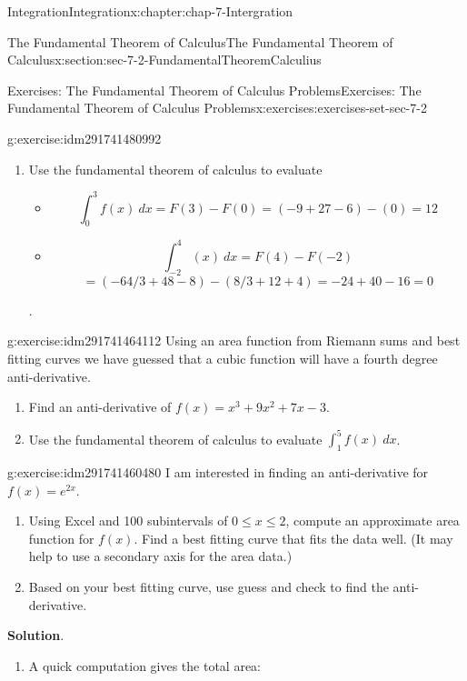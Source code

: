 \documentclass[oneside,10pt,]{book}
\numberwithin{equation}{section}
\begin{document}
\begin{chapterptx}{Integration}{}{Integration}{}{}{x:chapter:chap-7-Intergration}
\begin{sectionptx}{The Fundamental Theorem of Calculus}{}{The Fundamental Theorem of Calculus}{}{}{x:section:sec-7-2-FundamentalTheoremCalculius}
\begin{exercises-subsection}{Exercises: The Fundamental Theorem of Calculus Problems}{}{Exercises: The Fundamental Theorem of Calculus Problems}{}{}{x:exercises:exercises-set-sec-7-2}
\begin{divisionexercise}{7}{}{}{g:exercise:idm291741480992}
\begin{enumerate}[label=(\alph*)]
\item{}Use the fundamental theorem of calculus to evaluate%
\begin{itemize}[label=\textbullet]
\item{}%
\begin{equation*}
\int_0^3 f(x)\ dx=F(3)-F(0)=(-9+27-6)-(0)= 12
\end{equation*}
%
\item{}%
\begin{equation*}
\int_{-2}^4 (x)\ dx=F(4)-F(-2)
\end{equation*}
%
\begin{equation*}
=(-64/3+48-8)-(8/3+12+4)= -24+40-16=0
\end{equation*}
%
\end{itemize}
.%
\end{enumerate}
\end{divisionexercise}%
\begin{divisionexercise}{8}{}{}{g:exercise:idm291741464112}%
Using an area function from Riemann sums and best fitting curves we have guessed that a cubic function will have a fourth degree anti-derivative.%
%
\begin{enumerate}[label=(\alph*)]
\item{}Find an anti-derivative of \(f(x)=x^3+9x^2+7x-3\).%
\item{}Use the fundamental theorem of calculus to evaluate \(\int_1^5 f(x)\ dx\).%
\end{enumerate}
\end{divisionexercise}%
\begin{divisionexercise}{9}{}{}{g:exercise:idm291741460480}%
I am interested in finding an anti-derivative for \(f(x)=e^{2x}\).%
%
\begin{enumerate}[label=(\alph*)]
\item{}Using Excel and 100 subintervals of \(0 \le  x \le  2\), compute an approximate area function for \(f(x)\).  Find a best fitting curve that fits the data well.  (It may help to use a secondary axis for the area data.)%
\item{}Based on your best fitting curve, use guess and check to find the anti-derivative.%
\end{enumerate}
\par\smallskip%
\noindent\textbf{Solution}.\hypertarget{g:solution:idm291741456528}{}\quad{}%
\begin{enumerate}[label=(\alph*)]
\item{}A quick computation gives the total area:%
\begin{sidebyside}{1}{0}{0}{0}%

\end{sidebyside}
\end{enumerate}
\end{divisionexercise}
\end{exercises-subsection}
\end{sectionptx}
\end{chapterptx}
\end{document}
